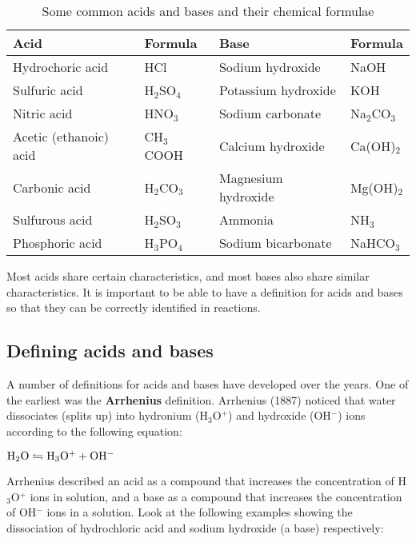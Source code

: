 \begin{table}[h]
\begin{center}
\caption{Some common acids and bases and their chemical formulae}
\label{tab:acids and bases}

\begin{tabular}{|l|l||l|l|}\hline
\textbf{Acid} & \textbf{Formula} & \textbf{Base} & \textbf{Formula}\\\hline\hline
Hydrochoric acid & HCl & Sodium hydroxide & NaOH \\\hline
Sulfuric acid & H$_{2}$SO$_{4}$ & Potassium hydroxide & KOH \\\hline
Nitric acid & HNO$_{3}$ & Sodium carbonate & Na$_{2}$CO$_{3}$\\\hline
Acetic (ethanoic) acid & CH$_{3}$COOH & Calcium hydroxide & Ca(OH)$_{2}$ \\\hline
Carbonic acid & H$_{2}$CO$_{3}$ & Magnesium hydroxide & Mg(OH)$_{2}$ \\\hline
Sulfurous acid & H$_{2}$SO$_{3}$ & Ammonia & NH$_{3}$ \\\hline
Phosphoric acid & H$_{3}$PO$_{4}$ & Sodium bicarbonate & NaHCO$_{3}$ \\\hline
\end{tabular}
\end{center}
\end{table}

Most acids share certain characteristics, and most bases also share similar characteristics. It is important to be able to have a definition for acids and bases so that they can be correctly identified in reactions.

\subsection{Defining acids and bases}

A number of definitions for acids and bases have developed over the years. One of the earliest was the \textbf{Arrhenius} definition. Arrhenius (1887) noticed that water dissociates (splits up) into hydronium (H$_{3}$O$^{+}$) and hydroxide (OH$^{-}$) ions according to the following equation:

\begin{center}
$\rm{H_{2}O \leftrightharpoons H_{3}O^{+} + OH^{-}}$
\end{center}


Arrhenius described an acid as a compound that increases the concentration of H$_{3}$O$^{+}$ ions in solution, and a base as a compound that increases the concentration of OH$^{-}$ ions in a solution. Look at the following examples showing the dissociation of hydrochloric acid and sodium hydroxide (a base) respectively:

